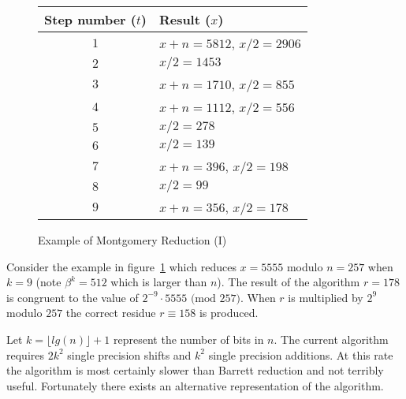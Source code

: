 \documentclass[b5paper]{book}
\begin{document}
\begin{figure}[here]
\begin{small}
\begin{center}
\begin{tabular}{|c|l|}
\hline \textbf{Step number ($t$)} & \textbf{Result ($x$)} \\
\hline $1$ & $x + n = 5812$, $x/2 = 2906$ \\
\hline $2$ & $x/2 = 1453$ \\
\hline $3$ & $x + n = 1710$, $x/2 = 855$ \\
\hline $4$ & $x + n = 1112$, $x/2 = 556$ \\
\hline $5$ & $x/2 = 278$ \\
\hline $6$ & $x/2 = 139$ \\
\hline $7$ & $x + n = 396$, $x/2 = 198$ \\
\hline $8$ & $x/2 = 99$ \\
\hline $9$ & $x + n = 356$, $x/2 = 178$ \\
\hline
\end{tabular}
\end{center}
\end{small}
\caption{Example of Montgomery Reduction (I)}
\label{fig:MONT1}
\end{figure}

Consider the example in figure~\ref{fig:MONT1} which reduces $x = 5555$ modulo $n = 257$ when $k = 9$ (note $\beta^k = 512$ which is larger than $n$).  The result of 
the algorithm $r = 178$ is congruent to the value of $2^{-9} \cdot 5555 \mbox{ (mod }257\mbox{)}$.  When $r$ is multiplied by $2^9$ modulo $257$ the correct residue 
$r \equiv 158$ is produced.  

Let $k = \lfloor lg(n) \rfloor + 1$ represent the number of bits in $n$.  The current algorithm requires $2k^2$ single precision shifts
and $k^2$ single precision additions.  At this rate the algorithm is most certainly slower than Barrett reduction and not terribly useful.  
Fortunately there exists an alternative representation of the algorithm.
\end{document}
